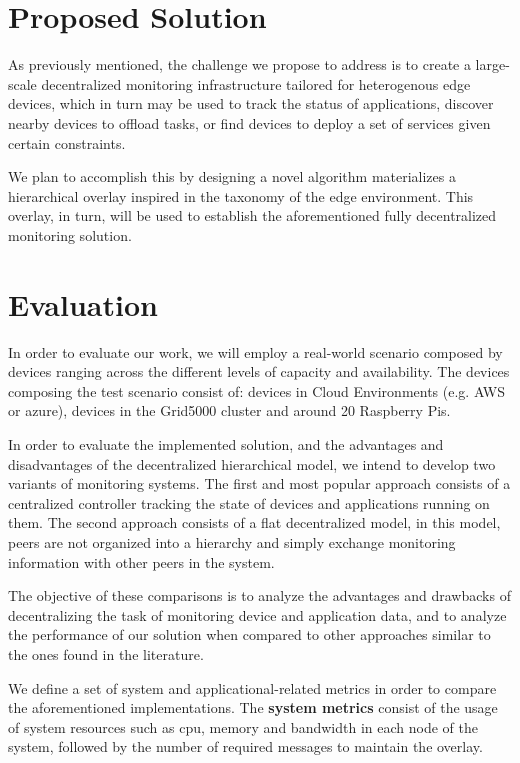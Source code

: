 \section{Proposed Solution}
\label{cha:proposed_sol}

As previously mentioned, the challenge we propose to address is to create a large-scale decentralized monitoring infrastructure tailored for heterogenous edge devices, which in turn may be used to track the status of applications, discover nearby devices to offload tasks, or find devices to deploy a set of services given certain constraints. 

We plan to accomplish this by designing a novel algorithm materializes a hierarchical overlay inspired in the taxonomy of the edge environment. This overlay, in turn, will be used to establish the aforementioned fully decentralized monitoring solution. 


\section{Evaluation}  

In order to evaluate our work, we will employ a real-world scenario composed by devices ranging across the different levels of capacity and availability. The devices composing the test scenario consist of: devices in Cloud Environments (e.g. AWS or azure), devices in the Grid5000 cluster and around 20 Raspberry Pis.

In order to evaluate the implemented solution, and the advantages and disadvantages of the decentralized hierarchical model, we intend to develop two variants of monitoring systems. The first and most popular approach consists of a centralized controller tracking the state of devices and applications running on them. The second approach consists of a flat decentralized model, in this model, peers are not organized into a hierarchy and simply exchange monitoring information with other peers in the system. 

The objective of these comparisons is to analyze the advantages and drawbacks of decentralizing the task of monitoring device and application data, and to analyze the performance of our solution when compared to other approaches similar to the ones found in the literature. 

We define a set of system and applicational-related metrics in order to compare the aforementioned implementations. The \textbf{system metrics} consist of the usage of system resources such as cpu, memory and bandwidth in each node of the system, followed by the number of required messages to maintain the overlay.

